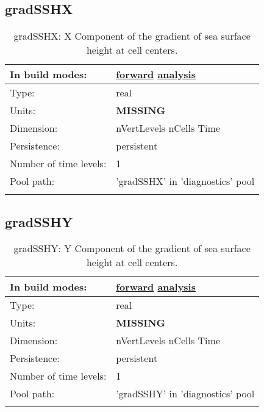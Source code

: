 \subsection[gradSSHX]{gradSSHX}
\label{subsec:var_sec_diagnostics_gradSSHX}
\begin{center}
\begin{longtable}{| p{2.0in} | p{4.0in} |}
        \hline 
        In build modes: & \hyperref[subsec:forward_var_tab_diagnostics]{forward} \hyperref[subsec:analysis_var_tab_diagnostics]{analysis} \\
        \hline 
        Type: & real \\
        \hline 
        Units: & {\bf \color{red} MISSING} \\
        \hline 
        Dimension: & nVertLevels nCells Time \\
        \hline 
        Persistence: & persistent \\
        \hline 
        Number of time levels: & 1 \\
        \hline 
            Pool path: & 'gradSSHX' in 'diagnostics' pool
 \\
		 \hline 
    \caption{gradSSHX: X Component of the gradient of sea surface height at cell centers.}
\end{longtable}
\end{center}
\subsection[gradSSHY]{gradSSHY}
\label{subsec:var_sec_diagnostics_gradSSHY}
\begin{center}
\begin{longtable}{| p{2.0in} | p{4.0in} |}
        \hline 
        In build modes: & \hyperref[subsec:forward_var_tab_diagnostics]{forward} \hyperref[subsec:analysis_var_tab_diagnostics]{analysis} \\
        \hline 
        Type: & real \\
        \hline 
        Units: & {\bf \color{red} MISSING} \\
        \hline 
        Dimension: & nVertLevels nCells Time \\
        \hline 
        Persistence: & persistent \\
        \hline 
        Number of time levels: & 1 \\
        \hline 
            Pool path: & 'gradSSHY' in 'diagnostics' pool
 \\
		 \hline 
    \caption{gradSSHY: Y Component of the gradient of sea surface height at cell centers.}
\end{longtable}
\end{center}
